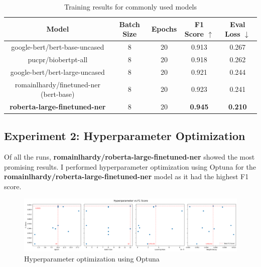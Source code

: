 \documentclass[a4paper,11pt]{article}
\begin{document}
\begin{table}[H]
	\centering
	\caption{Training results for commonly used models}
	\begin{tabular}{|c|c|c|c|c|}
		\hline
		\textbf{Model}                         & \textbf{Batch Size} & \textbf{Epochs} & \textbf{F1 Score $\uparrow$} & \textbf{Eval Loss $\downarrow$} \\ \hline
		google-bert/bert-base-uncased          & 8                   & 20              & 0.913                        & 0.267                           \\ \hline
		pucpr/biobertpt-all                    & 8                   & 20              & 0.918                        & 0.262                           \\ \hline
		google-bert/bert-large-uncased         & 8                   & 20              & 0.921                        & 0.244                           \\ \hline
		romainlhardy/finetuned-ner (bert-base) & 8                   & 20              & 0.923                        & 0.241                           \\ \hline
		\textbf{roberta-large-finetuned-ner}   & 8                   & 20              & \textbf{0.945}               & \textbf{0.210}                  \\ \hline
	\end{tabular}\label{tab:experiment_results}
\end{table}

\subsection{Experiment 2: Hyperparameter Optimization}
Of all the runs, \textbf{romainlhardy/roberta-large-finetuned-ner} showed the most promising
results. I performed hyperparameter optimization using Optuna for the
\textbf{romainlhardy/roberta-large-finetuned-ner} model as it had the highest F1 score.


\begin{figure}[H]
	\centering
	\includegraphics[width=6.5in]{./assets/hparam.png}
	\caption{Hyperparameter optimization using Optuna}\label{fig:hparam}
\end{figure}
\end{document}
